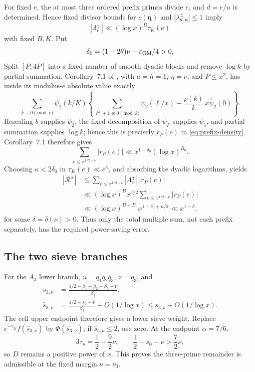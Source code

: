 \documentclass[10pt,reqno]{amsart}
\newcommand{\1}{\mathbf{1}}
\theoremstyle{plain}
\theoremstyle{remark}
\begin{document}
For fixed \(e\), the at most three ordered prefix primes divide \(e\), and
\(d=e/u\) is determined.  Hence fixed divisor bounds for \(c(\boldsymbol q)\)
and \(|\lambda_{d,\boldsymbol q}^{\pm}|\le1\) imply
\begin{equation}\label{eq:Lambda-divisor-bound}
 |\Lambda_e^{\pm}|\ll(\log x)^B\tau_K(e)
\end{equation}
with fixed \(B,K\).  Put
\[
 \delta_0=(1-2\theta)\nu-\varepsilon_{\rm GM}/4>0.
\]
Split \([P,4P]\) into a fixed number of smooth dyadic blocks and remove
\(\log k\) by partial summation.  Corollary~7.1 of
\cite{GrimmeltMerikoski2025}, with \(a=h=1\), \(\eta=\nu\), and
\(P\le x^2\), has inside its modulus-$e$ absolute value exactly
\[
 \sum_{k\equiv0\pmod e}\psi_1(k/K)
 \left\{\sum_{\ell^2+1\equiv0\pmod k}\psi_2(\ell/x)
       -\frac{\rho(k)}k\,x\widehat\psi_2(0)\right\}.
\]
Rescaling $b$ supplies $\psi_2$, the fixed decomposition of $\psi_P$
supplies $\psi_1$, and partial summation supplies $\log k$; hence this is
precisely $r_P(e)$ in \eqref{eq:prefix-density}.  Corollary~7.1 therefore
gives
\[
 \sum_{e\le x^{1/2-\nu}}|r_P(e)|
 \ll x^{1-\delta_0}(\log x)^{B_0}.
\]
Choosing \(\kappa<2\delta_0\) in
\(\tau_K(e)\ll e^\kappa\), and absorbing the dyadic logarithms, yields
\begin{equation}\label{eq:prefix-remainder-power-saving}
\begin{aligned}
 |\mathcal R^{\pm}|
 &\le\sum_{e\le x^{1/2-\nu}}|\Lambda_e^\pm|\,|r_P(e)|\\
 &\ll(\log x)^Bx^{\kappa/2}
       \sum_{e\le x^{1/2-\nu}}|r_P(e)|\\
 &\ll(\log x)^{B+B_0}x^{1-\delta_0+\kappa/2}
 \ll x^{1-\delta}.
\end{aligned}
\end{equation}
for some \(\delta=\delta(\nu)>0\).
Thus only the total multiple sum, not each prefix separately, has the
required power-saving error.

\subsection{The two sieve branches}

For the \(A_3\) lower branch, \(u=q_1q_2q_3\), \(z=q_3\), and
\[
\begin{aligned}
 s_{3,\nu}
 &=\frac{1/2-\beta_1-\beta_2-\beta_3-\nu}{\beta_3},\\
 \widehat s_{3,\nu}
 &=\frac{1/2-s_0-\nu}{\beta_3}+O(1/\log x)
 \le s_{3,\nu}+O(1/\log x).
\end{aligned}
\]
The cell upper endpoint therefore gives a lower sieve weight.  Replace
\(e^{-\gamma_E}f(\widehat s_{3,\nu})\) by
\(\Phi(\widehat s_{3,\nu})\); if \(\widehat s_{3,\nu}\le2\), use zero.
At the endpoint \(\alpha=7/6\),
\[
 3\tau_\nu=\frac12-\frac92\nu,\qquad
 \frac12-s_0-\nu>\frac72\nu,
\]
so \(D\) remains a positive power of \(x\).  This proves the three-prime
remainder is admissible at the fixed margin \(\nu=\nu_0\).
\end{document}
